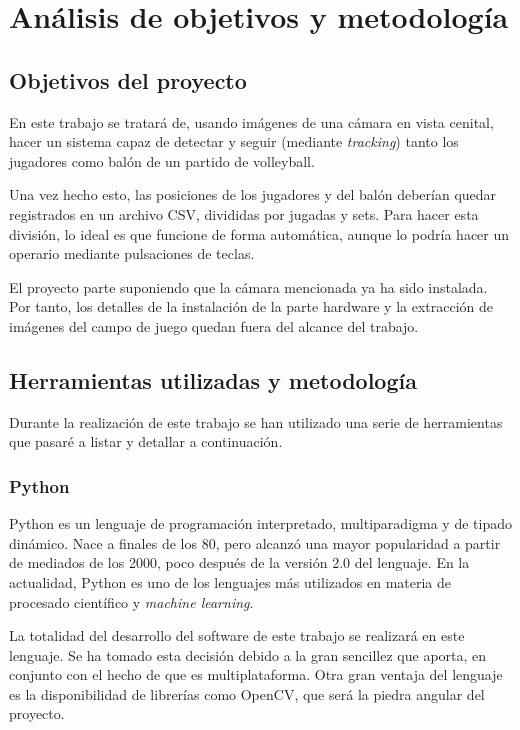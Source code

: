 \section{Análisis de objetivos y metodología}

\subsection{Objetivos del proyecto}
En este trabajo se tratará de, usando imágenes de una cámara en vista cenital, hacer un sistema capaz de detectar y seguir (mediante \textit{tracking}) tanto los jugadores como balón de un partido de volleyball.

Una vez hecho esto, las posiciones de los jugadores y del balón deberían quedar registrados en un archivo CSV, divididas por jugadas y sets. Para hacer esta división, lo ideal es que funcione de forma automática, aunque lo podría hacer un operario mediante pulsaciones de teclas.

El proyecto parte suponiendo que la cámara mencionada ya ha sido instalada. Por tanto, los detalles de la instalación de la parte hardware y la extracción de imágenes del campo de juego quedan fuera del alcance del trabajo.


\subsection{Herramientas utilizadas y metodología}
Durante la realización de este trabajo se han utilizado una serie de herramientas que pasaré a listar y detallar a continuación.

\subsubsection*{Python}
Python es un lenguaje de programación interpretado, multiparadigma y de tipado dinámico. Nace a finales de los 80, pero alcanzó una mayor popularidad a partir de mediados de los 2000, poco después de la versión 2.0 del lenguaje. En la actualidad, Python es uno de los lenguajes más utilizados en materia de procesado científico y \textit{machine learning}.

La totalidad del desarrollo del software de este trabajo se realizará en este lenguaje. Se ha tomado esta decisión debido a la gran sencillez que aporta, en conjunto con el hecho de que es multiplataforma. Otra gran ventaja del lenguaje es la disponibilidad de librerías como OpenCV, que será la piedra angular del proyecto. 


